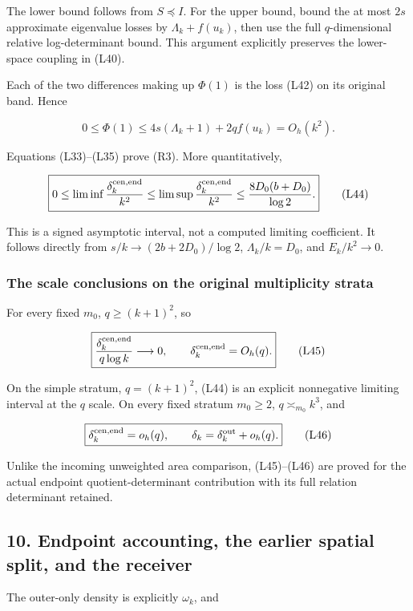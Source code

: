 \documentclass[11pt,a4paper]{article}
\begin{document}
The lower bound follows from \(S\preceq I\). For the upper bound, bound the at most \(2s\) approximate eigenvalue losses by \(\Lambda_k+f(u_k)\), then use the full \(q\)-dimensional relative log-determinant bound. This argument explicitly preserves the lower-space coupling in (L40).

Each of the two differences making up \(\Phi(1)\) is the loss (L42) on its original band. Hence

\[
\boxed{0\le\Phi(1)\le4s(\Lambda_k+1)+2qf(u_k)=O_h(k^2).}
\tag{L43}
\]

Equations (L33)--(L35) prove (R3). More quantitatively,

\[
\boxed{0\le\liminf\frac{\delta_k^{\rm cen,end}}{k^2}
\le\limsup\frac{\delta_k^{\rm cen,end}}{k^2}
\le\frac{8D_0(b+D_0)}{\log2}.}
\tag{L44}
\]

This is a signed asymptotic interval, not a computed limiting coefficient. It follows directly from \(s/k\to(2b+2D_0)/\log2\), \(\Lambda_k/k=D_0\), and \(E_k/k^2\to0\).

\subsubsection{The scale conclusions on the original multiplicity strata}\label{loc:the-scale-conclusions-on-the-original-multiplicity-strata}

For every fixed \(m_0\), \(q\ge(k+1)^2\), so

\[
\boxed{\frac{\delta_k^{\rm cen,end}}{q\log k}\longrightarrow0,
\qquad \delta_k^{\rm cen,end}=O_h(q).}
\tag{L45}
\]

On the simple stratum, \(q=(k+1)^2\), (L44) is an explicit nonnegative limiting interval at the \(q\) scale. On every fixed stratum \(m_0\ge2\),
\(q\asymp_{m_0}k^3\), and

\[
\boxed{\delta_k^{\rm cen,end}=o_h(q),\qquad
\delta_k=\delta_k^{\rm out}+o_h(q).}
\tag{L46}
\]

Unlike the incoming unweighted area comparison, (L45)--(L46) are proved for the actual endpoint quotient-determinant contribution with its full relation determinant retained.

\subsection{10. Endpoint accounting, the earlier spatial split, and the receiver}\label{loc:endpoint-accounting-the-earlier-spatial-split-and-the-receiver}

The outer-only density is explicitly \(\omega_k\), and
\end{document}
